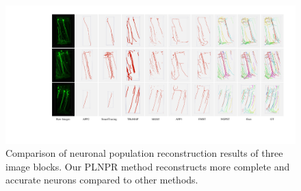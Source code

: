 \begin{figure}[t]
	\centering
	\includegraphics[width=1\textwidth]{./Illustrations/iteration3.pdf}
	\caption{Comparison of neuronal population reconstruction results of three image blocks. %
	Our PLNPR method reconstructs more complete and accurate neurons compared to other methods. 
	}
	\label{fig:compare_VISoR}
\end{figure}

